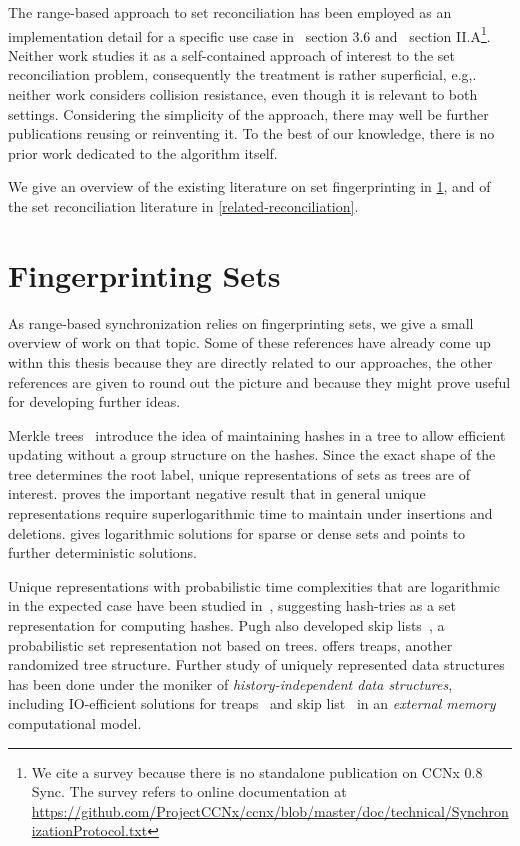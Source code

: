 
The range-based approach to set reconciliation has been employed as an implementation detail for a specific use case in~\cite{chen1999prototype} section 3.6 and~\cite{shang2017survey} section II.A\footnote{We cite a survey because there is no standalone publication on CCNx 0.8 Sync. The survey refers to online documentation at \url{https://github.com/ProjectCCNx/ccnx/blob/master/doc/technical/SynchronizationProtocol.txt}}. Neither work studies it as a self-contained approach of interest to the set reconciliation problem, consequently the treatment is rather superficial, e.g,. neither work considers collision resistance, even though it is relevant to both settings. Considering the simplicity of the approach, there may well be further publications reusing or reinventing it. To the best of our knowledge, there is no prior work dedicated to the algorithm itself.

We give an overview of the existing literature on set fingerprinting in \cref{related-fingerprinting}, and of the set reconciliation literature in \cref{related-reconciliation}.

\section{Fingerprinting Sets}
\label{related-fingerprinting}

As range-based synchronization relies on fingerprinting sets, we give a small overview of work on that topic. Some of these references have already come up withn this thesis because they are directly related to our approaches, the other references are given to round out the picture and because they might prove useful for developing further ideas.

Merkle trees~\cite{merkle1989certified} introduce the idea of maintaining hashes in a tree to allow efficient updating without a group structure on the hashes. Since the exact shape of the tree determines the root label, unique representations of sets as trees are of interest. \cite{uniquerepresentation} proves the important negative result that in general unique representations require superlogarithmic time to maintain under insertions and deletions. \cite{sundar1994unique} gives logarithmic solutions for sparse or dense sets and points to further deterministic solutions.

Unique representations with probabilistic time complexities that are logarithmic in the expected case have been studied in~\cite{pugh1989incremental}, suggesting hash-tries as a set representation for computing hashes. Pugh also developed skip lists~\cite{pugh1990skip}, a probabilistic set representation not based on trees. \cite{seidel1996randomized} offers treaps, another randomized tree structure. Further study of uniquely represented data structures has been done under the moniker of \textit{history-independent data structures}, including IO-efficient solutions for treaps~\cite{golovin2009b} and skip list~\cite{bender2016anti} in an \textit{external memory} computational model.

